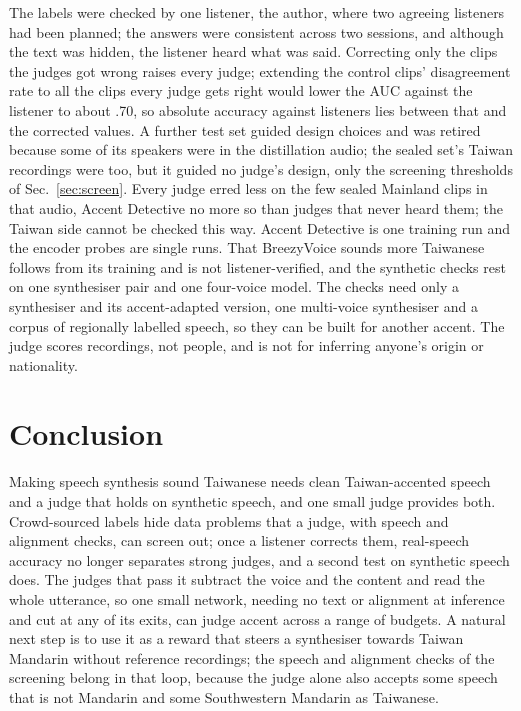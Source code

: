 \documentclass{Interspeech}
\begin{document}
The labels were checked by one listener, the author, where two agreeing listeners had been planned; the answers were consistent across two sessions, and although the text was hidden, the listener heard what was said. Correcting only the clips the judges got wrong raises every judge; extending the control clips' disagreement rate to all the clips every judge gets right would lower the AUC against the listener to about .70, so absolute accuracy against listeners lies between that and the corrected values. A further test set guided design choices and was retired because some of its speakers were in the distillation audio; the sealed set's Taiwan recordings were too, but it guided no judge's design, only the screening thresholds of Sec.~\ref{sec:screen}. Every judge erred less on the few sealed Mainland clips in that audio, Accent Detective no more so than judges that never heard them; the Taiwan side cannot be checked this way. Accent Detective is one training run and the encoder probes are single runs. That BreezyVoice sounds more Taiwanese follows from its training and is not listener-verified, and the synthetic checks rest on one synthesiser pair and one four-voice model. The checks need only a synthesiser and its accent-adapted version, one multi-voice synthesiser and a corpus of regionally labelled speech, so they can be built for another accent. The judge scores recordings, not people, and is not for inferring anyone's origin or nationality.

\section{Conclusion}

Making speech synthesis sound Taiwanese needs clean Taiwan-accented speech and a judge that holds on synthetic speech, and one small judge provides both. Crowd-sourced labels hide data problems that a judge, with speech and alignment checks, can screen out; once a listener corrects them, real-speech accuracy no longer separates strong judges, and a second test on synthetic speech does. The judges that pass it subtract the voice and the content and read the whole utterance, so one small network, needing no text or alignment at inference and cut at any of its exits, can judge accent across a range of budgets. A natural next step is to use it as a reward that steers a synthesiser towards Taiwan Mandarin without reference recordings; the speech and alignment checks of the screening belong in that loop, because the judge alone also accepts some speech that is not Mandarin and some Southwestern Mandarin as Taiwanese.



\end{document}
